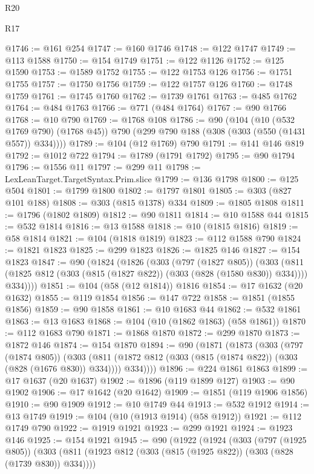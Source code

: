\begin{lexlean}{R20}
\begin{lexlean}{R17}
\begin{coremodule}
{{{{{{{{{{{{{{{{{{{{{{{{{{{{{{{{{{{{{{{{{{{{{{{{{{{{{{{{{{{{{{{{{{{{{{{{{{{{{{{{{{{{{{{{{{{{{{{{{{{{{{{{{{{@1746 := @161 @254
@1747 := @160 @1746
@1748 := @122 @1747
@1749 := @113 @1588
@1750 := @154 @1749
@1751 := @122 @1126
@1752 := @125 @1590
@1753 := @1589 @1752
@1755 := @122 @1753 @126
@1756 := @1751 @1755
@1757 := @1750 @1756
@1759 := @122 @1757 @126
@1760 := @1748 @1759
@1761 := @1745 @1760
@1762 := @1739 @1761
@1763 := @485 @1762
@1764 := @484 @1763
@1766 := @771 (@484 @1764)
@1767 := @90 @1766
@1768 := @10 @790
@1769 := @1768 @108
@1786 := @90
    (@104
      (@10 (@532 @1769 @790) (@1768 @45))
      @790
      (@299 @790 @188 (@308 (@303 (@550 (@1431 @557)) @334))))
@1789 := @104 (@12 @1769) @790
@1791 := @141 @146 @819
@1792 := @1012 @722
@1794 := @1789 (@1791 @1792)
@1795 := @90 @1794
@1796 := @1556 @11
@1797 := @299 @11
@1798 := LexLeanTarget.TargetSyntax.Prim.slice
@1799 := @136 @1798
@1800 := @125 @504
@1801 := @1799 @1800
@1802 := @1797 @1801
@1805 := @303 (@827 @101 @188)
@1808 := @303 (@815 @1378) @334
@1809 := @1805 @1808
@1811 := @1796 (@1802 @1809)
@1812 := @90 @1811
@1814 := @10 @1588 @44
@1815 := @532 @1814
@1816 := @13 @1588
@1818 := @10 (@1815 @1816)
@1819 := @58 @1814
@1821 := @104 (@1818 @1819)
@1823 := @112 @1588 @790
@1824 := @1821 @1823
@1825 := @299 @1823
@1826 := @1825 @146
@1827 := @154 @1823
@1847 := @90
    (@1824
      (@1826
        (@303
          (@797 (@1827 @805))
          (@303
            (@811 (@1825 @812 (@303 (@815 (@1827 @822)) (@303 (@828 (@1580 @830)) @334))))
            @334))))
@1851 := @104 (@58 (@12 @1814)) @1816
@1854 := @17 @1632 (@20 @1632)
@1855 := @119 @1854
@1856 := @147 @722
@1858 := @1851 (@1855 @1856)
@1859 := @90 @1858
@1861 := @10 @1683 @44
@1862 := @532 @1861
@1863 := @13 @1683
@1868 := @104 (@10 (@1862 @1863) (@58 @1861))
@1870 := @112 @1683 @790
@1871 := @1868 @1870
@1872 := @299 @1870
@1873 := @1872 @146
@1874 := @154 @1870
@1894 := @90
    (@1871
      (@1873
        (@303
          (@797 (@1874 @805))
          (@303
            (@811 (@1872 @812 (@303 (@815 (@1874 @822)) (@303 (@828 (@1676 @830)) @334))))
            @334))))
@1896 := @224 @1861 @1863
@1899 := @17 @1637 (@20 @1637)
@1902 := @1896 (@119 @1899 @127)
@1903 := @90 @1902
@1906 := @17 @1642 (@20 @1642)
@1909 := @1851 (@119 @1906 @1856)
@1910 := @90 @1909
@1912 := @10 @1749 @44
@1913 := @532 @1912
@1914 := @13 @1749
@1919 := @104 (@10 (@1913 @1914) (@58 @1912))
@1921 := @112 @1749 @790
@1922 := @1919 @1921
@1923 := @299 @1921
@1924 := @1923 @146
@1925 := @154 @1921
@1945 := @90
    (@1922
      (@1924
        (@303
          (@797 (@1925 @805))
          (@303
            (@811 (@1923 @812 (@303 (@815 (@1925 @822)) (@303 (@828 (@1739 @830)) @334))))
}}}}}}}}}}}}}}}}}}}}}}}}}}}}}}}}}}}}}}}}}}}}}}}}}}}}}}}}}}}}}}}}}}}}}}}}}}}}}}}}}}}}}}}}}}}}}}}}}}}}}}}}}}}
\end{coremodule}
\end{lexlean}
\end{lexlean}
